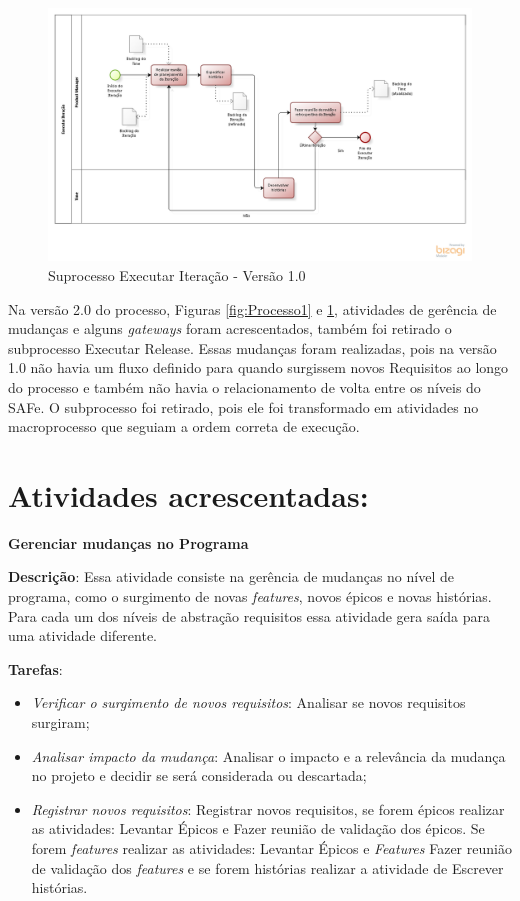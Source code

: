 \begin{figure}[!htb]
\includegraphics[scale=0.5]{figuras/iteracao1.png}
\caption{Suprocesso Executar Iteração - Versão 1.0}
\label{fig:iteracao1}
\end{figure}

\pagebreak

Na versão 2.0 do processo, Figuras \ref{fig:Processo1} e \ref{fig:iteracao1}, atividades de gerência de mudanças e alguns \textit{gateways} foram acrescentados, também foi retirado o subprocesso
Executar Release. Essas mudanças foram realizadas, pois na versão 1.0 não havia um fluxo definido para quando
surgissem novos Requisitos ao longo do processo e também não havia o relacionamento de volta entre os níveis do SAFe. 
O subprocesso foi retirado, pois ele foi transformado em atividades no macroprocesso que seguiam a ordem correta de execução.
  
\section{Atividades acrescentadas:}

\textbf{Gerenciar mudanças no Programa}

  \textbf{Descrição}: Essa atividade consiste na gerência de mudanças no nível de programa, como o surgimento de novas 
  \textit{features}, novos épicos e novas histórias. Para cada um dos níveis de abstração requisitos essa atividade gera saída
  para uma atividade diferente.

  \textbf{Tarefas}:
  \begin{itemize}
   \item \indent \textit{Verificar o surgimento de novos requisitos}: Analisar se novos requisitos surgiram;

   \item \indent \textit{Analisar impacto da mudança}: Analisar o impacto e a relevância da mudança no projeto e decidir se será considerada
   ou descartada;

   \item \indent \textit{Registrar novos requisitos}: Registrar novos requisitos, se forem épicos realizar as atividades: Levantar Épicos e 
   Fazer reunião de validação dos épicos. Se forem \textit{features} realizar as atividades: Levantar Épicos e \textit{Features}  
   Fazer reunião de validação dos \textit{features} e se forem histórias realizar a atividade de Escrever histórias.
  
  \end{itemize}

